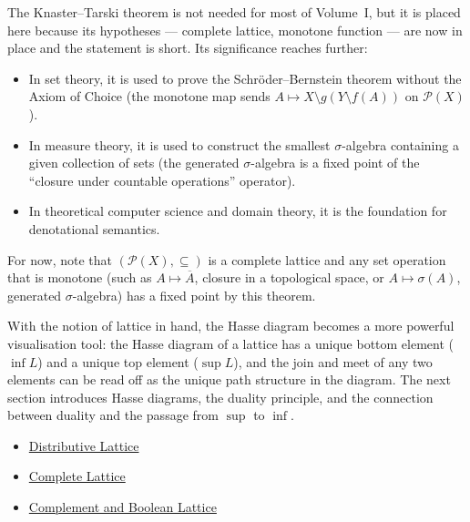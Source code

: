 \begin{remark*}[Exposition]
The Knaster--Tarski theorem is not needed for most of Volume~I, but it is
placed here because its hypotheses --- complete lattice, monotone function ---
are now in place and the statement is short.  Its significance reaches
further:
\begin{itemize}
  \item In set theory, it is used to prove the Schr\"{o}der--Bernstein theorem
        without the Axiom of Choice (the monotone map sends $A \mapsto
        X \setminus g(Y \setminus f(A))$ on $\mathcal{P}(X)$).
  \item In measure theory, it is used to construct the smallest
        $\sigma$-algebra containing a given collection of sets (the
        generated $\sigma$-algebra is a fixed point of the ``closure
        under countable operations'' operator).
  \item In theoretical computer science and domain theory, it is the
        foundation for denotational semantics.
\end{itemize}
For now, note that $(\mathcal{P}(X), \subseteq)$ is a complete lattice and
any set operation that is monotone (such as $A \mapsto \overline{A}$, closure
in a topological space, or $A \mapsto \sigma(A)$, generated $\sigma$-algebra)
has a fixed point by this theorem.
\end{remark*}

\begin{remark*}[Exposition]
With the notion of lattice in hand, the Hasse diagram becomes a more powerful
visualisation tool: the Hasse diagram of a lattice has a unique bottom element
($\inf L$) and a unique top element ($\sup L$), and the join and meet of any
two elements can be read off as the unique path structure in the diagram.
The next section introduces Hasse diagrams, the duality principle, and the
connection between duality and the passage from $\sup$ to $\inf$.
\end{remark*}

\begin{dependencies}
\begin{itemize}
  \item \hyperref[def:distributive-lattice]{Distributive Lattice}
  \item \hyperref[def:complete-lattice]{Complete Lattice}
  \item \hyperref[def:boolean-lattice]{Complement and Boolean Lattice}
\end{itemize}
\end{dependencies}
